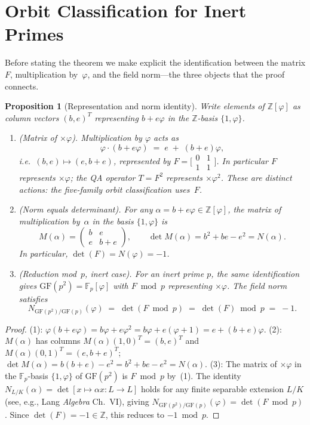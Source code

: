 \documentclass[12pt]{article}
\newtheorem{proposition}[theorem]{Proposition}
\begin{document}
\section{Orbit Classification for Inert Primes}

Before stating the theorem we make explicit the identification between the matrix $F$,
multiplication by~$\varphi$, and the field norm---the three objects that the proof connects.

\begin{proposition}[Representation and norm identity]\label{prop:rep-norm}
Write elements of\/ $\mathbb{Z}[\varphi]$ as column vectors $(b,e)^T$ representing
$b+e\varphi$ in the $\mathbb{Z}$-basis $\{1,\varphi\}$.
\begin{enumerate}
\item \textup{(Matrix of $\times\varphi$).}
Multiplication by $\varphi$ acts as
\[
  \varphi\cdot(b+e\varphi) \;=\; e \;+\; (b+e)\varphi,
\]
i.e.\ $(b,e)\mapsto(e,b+e)$, represented by $F=\bigl[\begin{smallmatrix}0&1\\1&1\end{smallmatrix}\bigr]$.
In particular \emph{$F$ represents $\times\varphi$}; the QA operator $T=F^2$ represents
$\times\varphi^2$.  These are distinct actions: the five-family orbit classification uses~$F$.

\item \textup{(Norm equals determinant).}
For any $\alpha=b+e\varphi\in\mathbb{Z}[\varphi]$, the matrix of multiplication by~$\alpha$
in the basis $\{1,\varphi\}$ is
\[
  M(\alpha)=\begin{pmatrix}b & e \\ e & b+e\end{pmatrix},
  \qquad
  \det M(\alpha) = b^2+be-e^2 = N(\alpha).
\]
In particular, $\det(F)=N(\varphi)=-1$.

\item \textup{(Reduction mod~$p$, inert case).}
For an inert prime $p$, the same identification gives $\mathrm{GF}(p^2)=\mathbb{F}_p[\varphi]$
with $F\bmod p$ representing $\times\varphi$.  The field norm satisfies
\[
  N_{\mathrm{GF}(p^2)/\mathrm{GF}(p)}(\varphi)
  \;=\; \det(F\bmod p)
  \;=\; \det(F)\bmod p \;=\; -1.
\]
\end{enumerate}
\end{proposition}

\begin{proof}
(1): $\varphi(b+e\varphi)=b\varphi+e\varphi^2=b\varphi+e(\varphi+1)=e+(b+e)\varphi$.
(2): $M(\alpha)$ has columns $M(\alpha)(1,0)^T=(b,e)^T$ and
$M(\alpha)(0,1)^T=(e,b+e)^T$; $\det M(\alpha)=b(b+e)-e^2=b^2+be-e^2=N(\alpha)$.
(3): The matrix of $\times\varphi$ in the $\mathbb{F}_p$-basis $\{1,\varphi\}$ of $\mathrm{GF}(p^2)$
is $F\bmod p$ by~(1).  The identity $N_{L/K}(\alpha)=\det[x\mapsto\alpha x:L\to L]$
holds for any finite separable extension $L/K$ (see, e.g., Lang \emph{Algebra} Ch.~VI),
giving $N_{\mathrm{GF}(p^2)/\mathrm{GF}(p)}(\varphi)=\det(F\bmod p)$.
Since $\det(F)=-1\in\mathbb{Z}$, this reduces to $-1\bmod p$.
\end{proof}
\end{document}
